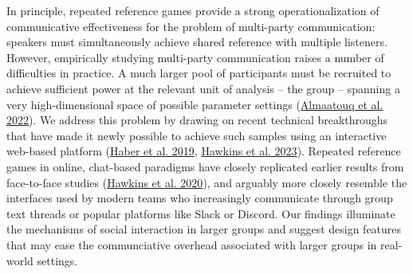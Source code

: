 \documentclass[
  english,
  a4paper,
]{article}
\begin{document}
In principle, repeated reference games provide a strong operationalization of communicative effectiveness for the problem of multi-party communication: speakers must simultaneously achieve shared reference with multiple listeners.
However, empirically studying multi-party communication raises a number of difficulties in practice.
A much larger pool of participants must be recruited to achieve sufficient power at the relevant unit of analysis -- the group -- spanning a very high-dimensional space of possible parameter settings (\protect\hyperlink{ref-almaatouq2022}{Almaatouq et al. 2022}).
We address this problem by drawing on recent technical breakthroughs that have made it newly possible to achieve such samples using an interactive web-based platform (\protect\hyperlink{ref-haber2019}{Haber et al. 2019}, \protect\hyperlink{ref-hawkins2023partners}{Hawkins et al. 2023}).
Repeated reference games in online, chat-based paradigms have closely replicated earlier results from face-to-face studies (\protect\hyperlink{ref-hawkins2020}{Hawkins et al. 2020}), and arguably more closely resemble the interfaces used by modern teams who increasingly communicate through group text threads or popular platforms like Slack or Discord.
Our findings illuminate the mechanisms of social interaction in larger groups and suggest design features that may ease the communciative overhead associated with larger groups in real-world settings.
\end{document}
